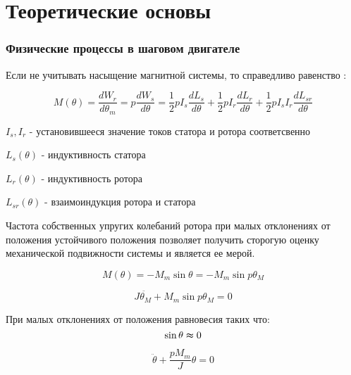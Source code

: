 \newpage
\part{ Теоретические основы }
\section{ Физические процессы в шаговом двигателе }
Если не учитывать насыщение магнитной системы, то справедливо равенство \cite[стр. 82]{Chilikin}:

\begin{equation}
\label{step_motor_torque_common}
    M(\theta)
    = \frac{dW_r}{d\theta_m}
    = p \frac{dW_s}{d\theta}
    = \frac{1}{2} p I_s \frac{dL_s}{d\theta}
        + \frac{1}{2} p I_r \frac{dL_r}{d\theta}
        + \frac{1}{2} p I_{s} I_r \frac{dL_{sr}}{d\theta}
\end{equation}

$I_{s}, I_{r}$ - установившееся значение токов статора и ротора соответсвенно

$L_{s}(\theta)$ - индуктивность статора

$L_{r}(\theta)$ - индуктивность ротора

$L_{sr}(\theta)$ - взаимоиндукция ротора и статора

Частота собственных упругих колебаний ротора \cite[гл 3.1]{Chilikin} при малых отклонениях от положения устойчивого
положения позволяет получить сторогую оценку механической подвижности системы и является ее мерой.

\begin{equation}
\label{step_motor_torque_without_load_and_with_unstable_rotor}
    M(\theta)
    = - M_{m} \sin{\theta}
    = - M_{m} \sin{p\theta_{M}}
\end{equation}

\begin{equation}
\label{step_motor_dynamic_move_equation}
    J \ddot{ \theta_{M} } + M_{m} \sin{p \theta_{M}} = 0
\end{equation}

При малых отклонениях от положения равновесия таких что:
\begin{equation}
    \sin{\theta} \thickapprox 0
\end{equation}

\begin{equation}
    \label{rotor_like_harmonical_oscilator_equation}
    \ddot{\theta} + \frac{p M_{m}}{J} \theta = 0
\end{equation}

